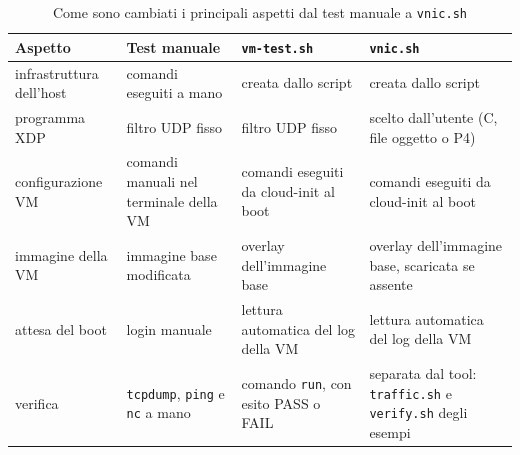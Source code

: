 \begin{table}[H]
    \centering
    \footnotesize
    \begin{tabular}{@{}>{\raggedright\arraybackslash}p{2.5cm}>{\raggedright\arraybackslash}p{3.7cm}>{\raggedright\arraybackslash}p{3.7cm}>{\raggedright\arraybackslash}p{3.7cm}@{}}
        \toprule
        \textbf{Aspetto} & \textbf{Test manuale} & \textbf{\texttt{vm-test.sh}} & \textbf{\texttt{vnic.sh}} \\
        \midrule
        infrastruttura dell'host & comandi eseguiti a mano & creata dallo script & creata dallo script \\
        \addlinespace
        programma XDP & filtro UDP fisso & filtro UDP fisso & scelto dall'utente (C, file oggetto o P4) \\
        \addlinespace
        configurazione VM & comandi manuali nel terminale della VM & comandi eseguiti da cloud-init al boot & comandi eseguiti da cloud-init al boot \\
        \addlinespace
        immagine della VM & immagine base modificata & overlay dell'immagine base & overlay dell'immagine base, scaricata se assente \\
        \addlinespace
        attesa del boot & login manuale & lettura automatica del log della VM & lettura automatica del log della VM \\
        \addlinespace
        verifica & \texttt{tcpdump}, \texttt{ping} e \texttt{nc} a mano & comando \texttt{run}, con esito PASS o FAIL & separata dal tool: \texttt{traffic.sh} e \texttt{verify.sh} degli esempi \\
        \bottomrule
    \end{tabular}
    \caption{Come sono cambiati i principali aspetti dal test manuale a \texttt{vnic.sh}}
    \label{tab:evoluzione}
\end{table}
